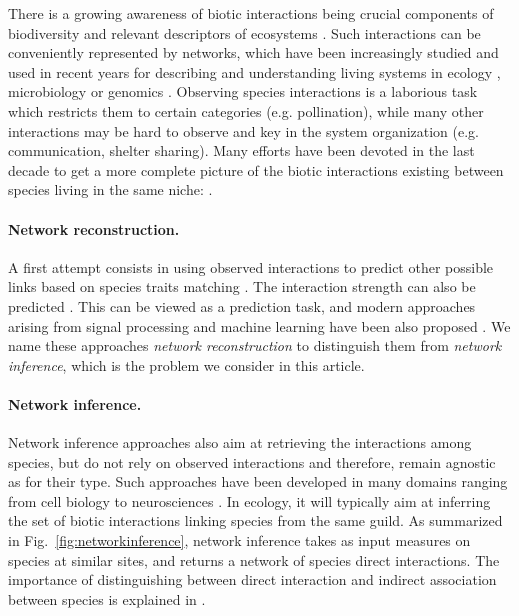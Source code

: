 There is a growing awareness of biotic interactions being crucial components of biodiversity and relevant descriptors of ecosystems \citep{valiente,jordanoS}. 
Such interactions can be conveniently represented by networks, which have been increasingly studied and used in recent years for describing and understanding living systems in ecology \citep{poisot}, microbiology \citep{faust} or genomics \citep{evans}. 
Observing species interactions is a laborious task which restricts them to certain categories (e.g.  pollination), while many other  interactions may be hard to observe and key in the system organization (e.g. communication, shelter sharing). Many efforts have been devoted in the last decade to get a more complete picture of the biotic interactions existing between species living in the same niche: .

\paragraph{Network reconstruction.} 
A first attempt consists in using observed interactions  to predict other possible links based on species traits matching \citep[see e.g.][]{OlF15,BGT16,WeG17,GrW18}. The  interaction strength can also be predicted \citep{WeO13}. This  can be viewed as a prediction task, and modern approaches arising from signal processing and machine learning have been also proposed \citep{DPL17,SPW17,DPD17}. We name these approaches {\sl network reconstruction} to distinguish them from {\sl network inference}, which is the problem we consider in this article.

\paragraph{Network inference.} 
Network inference approaches also aim at retrieving the interactions among species, but do not rely on observed interactions and therefore, remain agnostic as for their type. Such approaches have been developed in many domains ranging from cell biology \citep[][to infer gene regulatory networks]{Fri04} to neurosciences \citep[][to deciphere brain connectivity structures]{ZhC18}. In ecology, it will typically aim at inferring the set of biotic interactions linking species from the same guild.  As  summarized in Fig.~\ref{fig:networkinference}, network inference takes as input measures on species  at similar sites, and returns a network of species direct interactions. The importance of distinguishing between direct interaction and indirect association between species is explained in \citet{PWT19}. 

